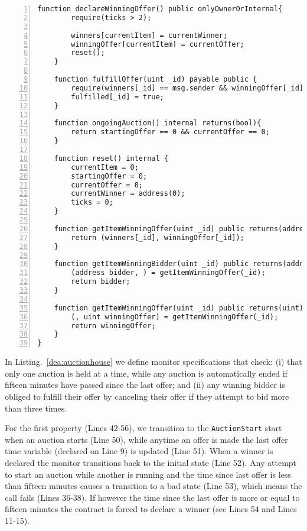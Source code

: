\documentclass{article}
\begin{document}
\begin{lstlisting}[language=DEA,basicstyle=\scriptsize,numbers=left,numbersep=2pt,xleftmargin=0.3cm,escapechar=\%,label={lt:auctionhouse},caption={A auction house smart contract.}]
    function declareWinningOffer() public onlyOwnerOrInternal{
        require(ticks > 2);

        winners[currentItem] = currentWinner;
        winningOffer[currentItem] = currentOffer;
        reset();
    }

    function fulfillOffer(uint _id) payable public {
        require(winners[_id] == msg.sender && winningOffer[_id] == msg.value && !fulfilled[_id]);
        fulfilled[_id] = true;
    }

    function ongoingAuction() internal returns(bool){
        return startingOffer == 0 && currentOffer == 0;
    }

    function reset() internal {
        currentItem = 0;
        startingOffer = 0;
        currentOffer = 0;
        currentWinner = address(0);
        ticks = 0;
    }

    function getItemWinningOffer(uint _id) public returns(address,uint){
        return (winners[_id], winningOffer[_id]);
    }

    function getItemWinningBidder(uint _id) public returns(address){
        (address bidder, ) = getItemWinningOffer(_id);
        return bidder;
    }

    function getItemWinningOffer(uint _id) public returns(uint){
        (, uint winningOffer) = getItemWinningOffer(_id);
        return winningOffer;
    }
}
\end{lstlisting}\normalsize

In Listing.~\ref{dea:auctionhouse} we define monitor specifications that check: (i) that only one auction is held at a time, while any auction is automatically ended if fifteen minutes have passed since the last offer; and (ii) any winning bidder is obliged to fulfill their offer by canceling their offer if they attempt to bid more than three times.

For the first property (Lines 42-56), we transition to the \texttt{AuctionStart} start when an auction starts (Line 50), while anytime an offer is made the last offer time variable (declared on Line 9) is updated (Line 51). When a winner is declared the monitor transitions back to the initial state (Line 52). Any attempt to start an auction while another is running and the time since last offer is less than fifteen minutes causes a transition to a bad state (Line 53), which means the call fails (Lines 36-38). If however the time since the last offer is more or equal to fifteen minutes the contract is forced to declare a winner (see Lines 54 and Lines 11-15).
\end{document}
